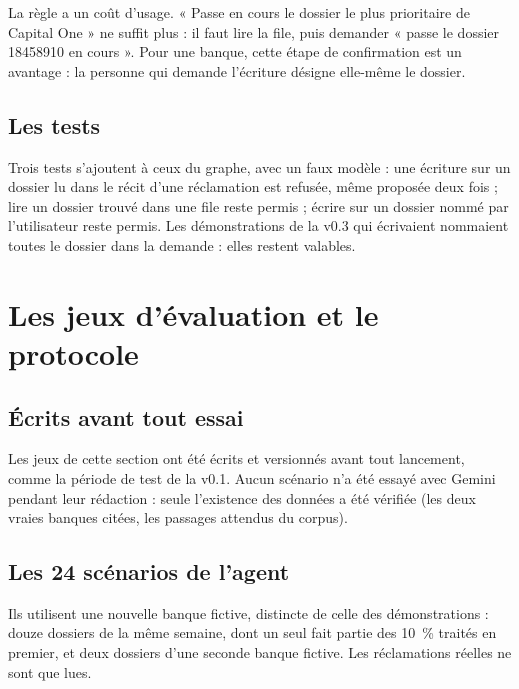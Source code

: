 \documentclass[11pt,a4paper]{article}
\begin{document}
La règle a un coût d'usage. « Passe en cours le dossier le plus prioritaire de Capital One » ne suffit plus : il faut lire la file, puis demander « passe le dossier 18458910 en cours ». Pour une banque, cette étape de confirmation est un avantage : la personne qui demande l'écriture désigne elle-même le dossier.

\subsection{Les tests}

Trois tests s'ajoutent à ceux du graphe, avec un faux modèle : une écriture sur un dossier lu dans le récit d'une réclamation est refusée, même proposée deux fois ; lire un dossier trouvé dans une file reste permis ; écrire sur un dossier nommé par l'utilisateur reste permis. Les démonstrations de la v0.3 qui écrivaient nommaient toutes le dossier dans la demande : elles restent valables.

\section{Les jeux d'évaluation et le protocole}

\subsection{Écrits avant tout essai}

Les jeux de cette section ont été écrits et versionnés avant tout lancement, comme la période de test de la v0.1. Aucun scénario n'a été essayé avec Gemini pendant leur rédaction : seule l'existence des données a été vérifiée (les deux vraies banques citées, les passages attendus du corpus).

\subsection{Les 24 scénarios de l'agent}

Ils utilisent une nouvelle banque fictive, distincte de celle des démonstrations : douze dossiers de la même semaine, dont un seul fait partie des 10~\% traités en premier, et deux dossiers d'une seconde banque fictive. Les réclamations réelles ne sont que lues.
\end{document}
